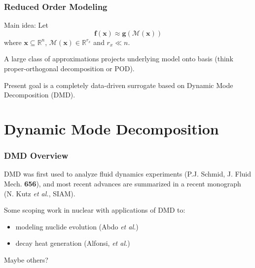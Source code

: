 \documentclass[fleqn]{beamer}
\renewcommand{\vec}[1]{\bm{#1}} %
\begin{document}
\begin{frame}
    
\frametitle{Reduced Order Modeling}

Main idea: Let
\begin{equation*}
 \vec{f}(\vec{x})\approx \vec{g}(\mathcal{M}(\vec{x}))
\end{equation*}
where $\vec{x} \subseteq \mathbb{R}^n$, $\mathcal{M}(\vec{x}) \in \mathbb{R}^{r_x}$ and $r_x \ll n$.

\pause
\vfill

A large class of approximations projects underlying model onto basis (think proper-orthogonal decomposition or POD).

\pause
\vfill 

Present goal is a completely data-driven surrogate based on Dynamic Mode Decomposition (DMD).

\end{frame}


\section{Dynamic Mode Decomposition}

\begin{frame}
\frametitle{DMD Overview}


DMD was first used to analyze fluid dynamics experiments (P.J. Schmid, J. Fluid Mech. {\bf 656}), and most recent advances are summarized in a recent monograph (N. Kutz {\it et al.}, SIAM).

\pause
\vfill

Some scoping work in nuclear with applications of DMD to:
\begin{itemize}
 \item modeling nuclide evolution (Abdo {\it et al.})
 \item decay heat generation (Alfonsi, {\it et al.})
\end{itemize}
Maybe others?

% 

\end{frame}
\end{document}
